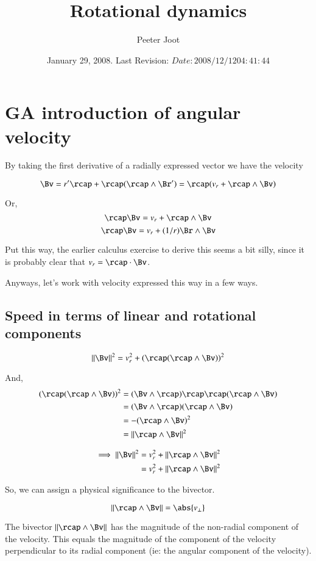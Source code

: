 \documentclass{article}
\title{Rotational dynamics}
\author{Peeter Joot}
\date{ January 29, 2008.  Last Revision: $Date: 2008/12/12 04:41:44 $}
\newcommand{\Norm}[1]{\left\lVert{#1}\right\rVert}
\begin{document}
             

\maketitle{}

\section{GA introduction of angular velocity}

By taking the first derivative of a radially expressed vector we have the velocity 

\[
\Bv 
   = r'\rcap + \rcap(\rcap \wedge \Br')
   = \rcap( v_r + \rcap \wedge \Bv )
\]

Or,
\[
\rcap \Bv = v_r + \rcap \wedge \Bv
\]
\[
\rcap \Bv = v_r + (1/r)\Br \wedge \Bv
\]

Put this way, the earlier calculus exercise to derive this seems a bit silly, since it is probably clear that $v_r = \rcap \cdot \Bv$.

Anyways, let's work with velocity expressed this way in a few ways.

\subsection{Speed in terms of linear and rotational components}

\[
\Norm{\Bv}^2 = v_r^2 + (\rcap(\rcap \wedge \Bv))^2
\]

And,
\begin{align*}
(\rcap(\rcap \wedge \Bv))^2 
   &= (\Bv \wedge \rcap)\rcap \rcap(\rcap \wedge \Bv) \\
   &= (\Bv \wedge \rcap)(\rcap \wedge \Bv) \\
   &= -(\rcap \wedge \Bv)^2 \\
   &= \Norm{\rcap \wedge \Bv}^2 \\
\end{align*}

\begin{align*}
\implies
\Norm{\Bv}^2 &= v_r^2 + \Norm{\rcap \wedge \Bv}^2 \\
             &= v_r^2 + \Norm{\rcap \wedge \Bv}^2 \\
\end{align*}

So, we can assign a physical significance to the bivector.

\[
\Norm{\rcap \wedge \Bv} = \abs{v_{\perp}} 
\]

The bivector $\Norm{\rcap \wedge \Bv}$ has the magnitude of the non-radial component of the velocity.  This
equals the magnitude of the component of the velocity perpendicular to its radial component (ie: the angular component of the velocity).
\end{document}
